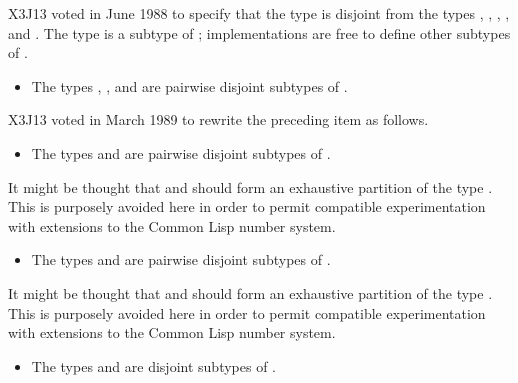 \begin{new}
X3J13 voted in June 1988 
to specify that the type 
is disjoint from the types , , , , and .
The type  is a subtype of ;
implementations are free to define other subtypes of .
\end{new}

\begin{obsolete}
\begin{itemize}
\item
The types , , and  are pairwise disjoint
subtypes of .
\end{itemize}
\end{obsolete}

\begin{newer}
X3J13 voted in March 1989  to rewrite the preceding item
as follows.
\begin{itemize}
\item
The types  and  are pairwise disjoint
subtypes of .
\end{itemize}

\beforenoterule
\begin{rationale}
It might be thought that  and  should
form an exhaustive partition of the type .  This is purposely
avoided here in order to permit compatible experimentation with extensions
to the Common Lisp number system.
\end{rationale}
\afternoterule

\begin{itemize}
\item
The types  and  are pairwise disjoint
subtypes of .
\end{itemize}

\beforenoterule
\begin{rationale}
It might be thought that  and  should
form an exhaustive partition of the type .  This is purposely
avoided here in order to permit compatible experimentation with extensions
to the Common Lisp number system.
\end{rationale}
\afternoterule
\end{newer}

\begin{itemize}
\item
The types  and  are disjoint subtypes of .
\end{itemize}


